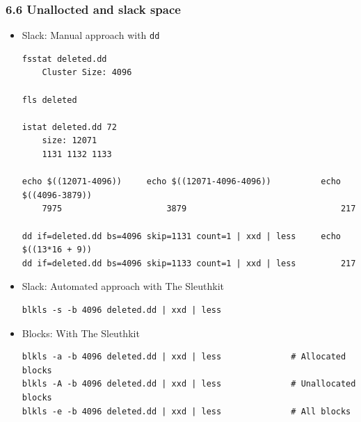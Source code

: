 \begin{frame}[fragile]
  \frametitle{6.6 Unallocted and slack space}
    \begin{itemize}
	    \item Slack: Manual approach with \texttt{dd}
  \begin{lstlisting}[basicstyle=\tiny]
fsstat deleted.dd
    Cluster Size: 4096

fls deleted

istat deleted.dd 72
    size: 12071
    1131 1132 1133

echo $((12071-4096))     echo $((12071-4096-4096))          echo $((4096-3879))
    7975                     3879                               217

dd if=deleted.dd bs=4096 skip=1131 count=1 | xxd | less     echo $((13*16 + 9))
dd if=deleted.dd bs=4096 skip=1133 count=1 | xxd | less         217
  \end{lstlisting}
	    \item Slack: Automated approach with The Sleuthkit
  \begin{lstlisting}[basicstyle=\tiny]
blkls -s -b 4096 deleted.dd | xxd | less
  \end{lstlisting}
	    \item Blocks: With The Sleuthkit
  \begin{lstlisting}[basicstyle=\tiny]
blkls -a -b 4096 deleted.dd | xxd | less              # Allocated blocks
blkls -A -b 4096 deleted.dd | xxd | less              # Unallocated blocks
blkls -e -b 4096 deleted.dd | xxd | less              # All blocks
  \end{lstlisting}
    \end{itemize}
\end{frame}


